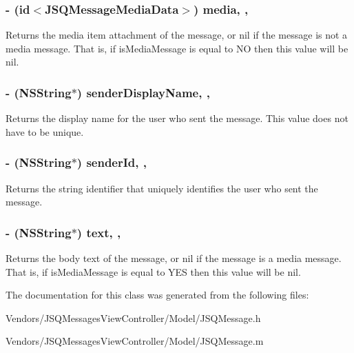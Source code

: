 \subsubsection[{media}]{\setlength{\rightskip}{0pt plus 5cm}-\/ (id$<${\bf J\+S\+Q\+Message\+Media\+Data}$>$) media\hspace{0.3cm}{\ttfamily [read]}, {\ttfamily [nonatomic]}, {\ttfamily [copy]}}\label{interface_j_s_q_message_af6afdd2a8e17b8513821b7d1d62e0181}
Returns the media item attachment of the message, or {\ttfamily nil} if the message is not a media message. That is, if {\ttfamily is\+Media\+Message} is equal to {\ttfamily N\+O} then this value will be {\ttfamily nil}. \hypertarget{interface_j_s_q_message_ad5221a5e8e93cda57875efd26154cbcc}{}
\subsubsection[{sender\+Display\+Name}]{\setlength{\rightskip}{0pt plus 5cm}-\/ (N\+S\+String$\ast$) sender\+Display\+Name\hspace{0.3cm}{\ttfamily [read]}, {\ttfamily [nonatomic]}, {\ttfamily [copy]}}\label{interface_j_s_q_message_ad5221a5e8e93cda57875efd26154cbcc}
Returns the display name for the user who sent the message. This value does not have to be unique. \hypertarget{interface_j_s_q_message_a2319678d102c89d8d936de6123e8b2dd}{}
\subsubsection[{sender\+Id}]{\setlength{\rightskip}{0pt plus 5cm}-\/ (N\+S\+String$\ast$) sender\+Id\hspace{0.3cm}{\ttfamily [read]}, {\ttfamily [nonatomic]}, {\ttfamily [copy]}}\label{interface_j_s_q_message_a2319678d102c89d8d936de6123e8b2dd}
Returns the string identifier that uniquely identifies the user who sent the message. \hypertarget{interface_j_s_q_message_ab3d3b9aacf746c2c98bb4abe0944aa6d}{}
\subsubsection[{text}]{\setlength{\rightskip}{0pt plus 5cm}-\/ (N\+S\+String$\ast$) text\hspace{0.3cm}{\ttfamily [read]}, {\ttfamily [nonatomic]}, {\ttfamily [copy]}}\label{interface_j_s_q_message_ab3d3b9aacf746c2c98bb4abe0944aa6d}
Returns the body text of the message, or {\ttfamily nil} if the message is a media message. That is, if {\ttfamily is\+Media\+Message} is equal to {\ttfamily Y\+E\+S} then this value will be {\ttfamily nil}. 

The documentation for this class was generated from the following files\+:\begin{DoxyCompactItemize}
\item 
Vendors/\+J\+S\+Q\+Messages\+View\+Controller/\+Model/J\+S\+Q\+Message.\+h\item 
Vendors/\+J\+S\+Q\+Messages\+View\+Controller/\+Model/J\+S\+Q\+Message.\+m\end{DoxyCompactItemize}
